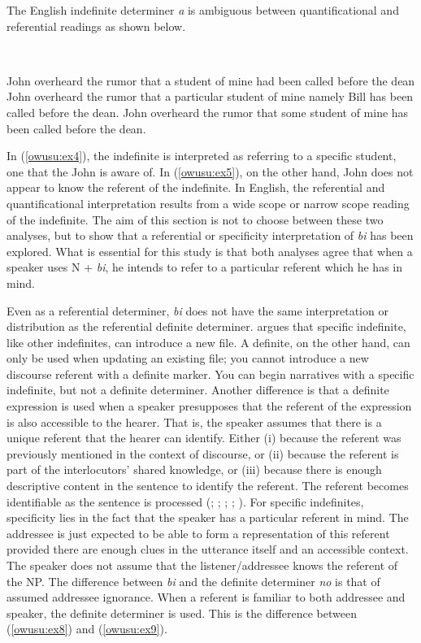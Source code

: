 \documentclass[output=paper,modfonts,nonflat,draftmode]{langsci/langscibook}
\begin{document}
The English indefinite determiner \emph{a} is ambiguous between quantificational and referential readings as shown below.

\ea
{}\\
\ea\label{owusu:ex3}

John overheard the rumor that a student of mine had been called before the dean
\ea \label{owusu:ex4} John overheard the rumor that a particular student of mine namely Bill has been called before the dean.
\ex \label{owusu:ex5} John overheard the rumor that some student of mine has been called before the dean.
\z\z 
\z 

In (\ref{owusu:ex4}), the indefinite is interpreted as referring to a specific student, one that the John is aware of. In (\ref{owusu:ex5}), on the other hand, John does not appear to know the referent of the indefinite. In English, the referential and quantificational interpretation results from a wide scope or narrow scope reading of the indefinite. 
The aim of this section is not to choose between these two analyses, but to show that a referential or specificity interpretation of \emph{bi} has been explored. What is essential for this study is that both analyses agree that when a speaker uses  N + \emph{bi}, he intends to refer to a particular referent which he has in mind.            


Even as a referential determiner, \emph{bi} does not have the same interpretation or distribution as the referential definite determiner. \citet{Heim1983} argues that specific indefinite, like other indefinites, can introduce a new file. A definite, on the other hand, can only be used when updating an existing file; you cannot introduce a new discourse referent with a definite marker. You can begin narratives with a specific indefinite, but not a definite determiner. Another difference is that a definite expression is used when a speaker presupposes that the referent of the expression is also accessible to the hearer. That is, the speaker assumes that there is a unique referent that the hearer can identify. Either (i) because the referent was previously mentioned in the context of discourse, or (ii) because the referent is part of the interlocutors’ shared knowledge, or (iii) because there is enough descriptive content in the sentence to identify the referent.  The referent becomes identifiable as the sentence is processed (\citealt[135]{Comrie1989}; \citealt[450]{Givon2001}; \citealt[277]{GundelEtAlZacharski1993}; \citealt[167--168]{Hawkins1978}; \citealt[263]{Payne1997}). For specific indefinites, specificity lies in the fact that the speaker has a particular referent in mind. The addressee is just expected to be able to form a representation of this referent provided there are enough clues in the utterance itself and an accessible context. The speaker does not assume that the listener/addressee knows the referent of the NP. The difference between \emph{bi} and the definite determiner \emph{no} is that of assumed addressee ignorance. When a referent is familiar to both addressee and speaker, the definite determiner is used. This is the difference between (\ref{owusu:ex8}) and (\ref{owusu:ex9}). 
\end{document}
